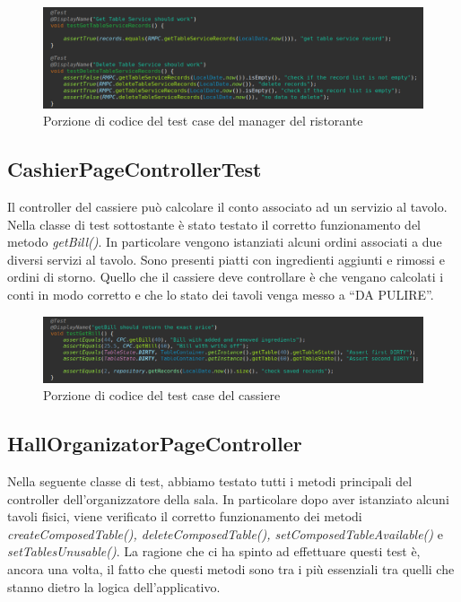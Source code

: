 \documentclass{article}
\begin{document}
\begin{figure}[!h]
\centering
\includegraphics[width= 14cm]{"Codice/TestManager.PNG"}
\caption{Porzione di codice del test case del manager del ristorante}
\end{figure}

\subsection{CashierPageControllerTest}

Il controller del cassiere pu\`o calcolare il conto associato ad un servizio al tavolo. Nella classe di test sottostante è stato testato il corretto funzionamento del metodo \textit{getBill()}. In particolare vengono istanziati alcuni ordini associati a due diversi servizi al tavolo. Sono presenti piatti con ingredienti aggiunti e rimossi e ordini di storno. Quello che il cassiere deve controllare \`e che vengano calcolati i conti in modo corretto e che lo stato dei tavoli venga messo a ``DA PULIRE''.

\begin{figure}[!h]
\centering
\includegraphics[width= 14cm]{"Codice/TestCashier.PNG"}
\caption{Porzione di codice del test case del cassiere}
\end{figure}

\newpage

\subsection{HallOrganizatorPageController}

Nella seguente classe di test, abbiamo testato tutti i metodi principali del controller dell’organizzatore della sala. In particolare dopo aver istanziato alcuni tavoli fisici, viene verificato il corretto funzionamento dei metodi \textit{createComposedTable(), deleteComposedTable(), setComposedTableAvailable()} e \textit{setTablesUnusable()}. La ragione che ci ha spinto ad effettuare questi test \`e, ancora una volta, il fatto che questi metodi sono tra i pi\`u essenziali tra quelli che stanno dietro la logica dell’applicativo.
\end{document}

